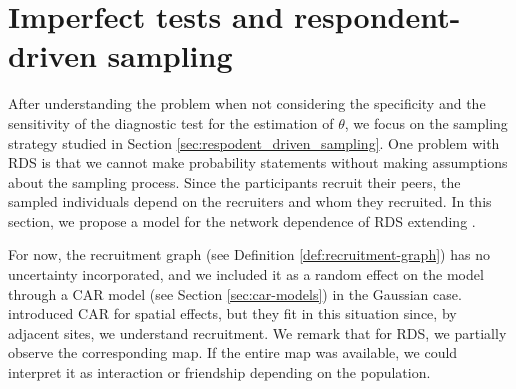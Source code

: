 \section{Imperfect tests and respondent-driven sampling}

After understanding the problem when not considering the specificity and the
sensitivity of the diagnostic test for the estimation of $\theta$, we focus on
the sampling strategy studied in Section \ref{sec:respodent_driven_sampling}.
One problem with RDS is that we
cannot make probability statements without making assumptions about the
sampling process. Since the participants recruit their peers, the sampled
individuals depend on the recruiters and whom they recruited. In this section,
we propose a model for the network dependence of RDS extending
\textcite{bastos2012binary}.

For now, the recruitment graph (see Definition  \ref{def:recruitment-graph})
has no uncertainty
incorporated, and we included it as a random effect on the model through a
CAR model (see Section \ref{sec:car-models}) in the Gaussian case.
\textcite{besag1974spatial} introduced
CAR for spatial effects, but they fit in this situation since, by
adjacent sites, we understand recruitment. We remark that for RDS, we
partially observe the corresponding map. If the entire map was available, we
could interpret it as interaction or friendship depending on the population.

